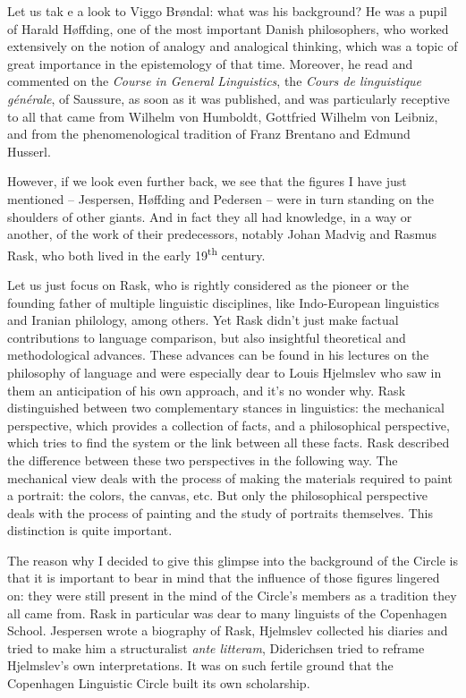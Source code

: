 Let us tak e a look to Viggo Brøndal: what was his background? He was a pupil of Harald Høffding, one of the most important Danish philosophers, who worked extensively on the notion of analogy and analogical thinking, which was a topic of great importance in the epistemology of that time. Moreover, he read and commented on the \textit{Course in General Linguistics}, the \textit{Cours de linguistique générale}, of Saussure, as soon as it was published, and was particularly receptive to all that came from Wilhelm von Humboldt, Gottfried Wilhelm von Leibniz, and from the phenomenological tradition of Franz Brentano and Edmund Husserl. 

However, if we look even further back, we see that the figures I have just mentioned – Jespersen, Høffding and Pedersen – were in turn standing on the shoulders of other giants. And in fact they all had knowledge, in a way or another, of the work of their predecessors, notably Johan Madvig and Rasmus Rask, who both lived in the early 19\textsuperscript{th} century. 

Let us just focus on Rask, who is rightly considered as the pioneer or the founding father of multiple linguistic disciplines, like Indo-European linguistics and Iranian philology, among others. Yet Rask didn’t just make factual contributions to language comparison, but also insightful theoretical and methodological advances. These advances can be found in his lectures on the philosophy of language and were especially dear to Louis Hjelmslev who saw in them an anticipation of his own approach, and it’s no wonder why. Rask distinguished between two complementary stances in linguistics: the mechanical perspective, which provides a collection of facts, and a philosophical perspective, which tries to find the system or the link between all these facts. Rask described the difference between these two perspectives in the following way. The mechanical view deals with the process of making the materials required to paint a portrait: the colors, the canvas, etc. But only the philosophical perspective deals with the process of painting and the study of portraits themselves. This distinction is quite important. 

The reason why I decided to give this glimpse into the background of the Circle is that it is important to bear in mind that the influence of those figures lingered on: they were still present in the mind of the Circle’s members as a tradition they all came from. Rask in particular was dear to many linguists of the Copenhagen School. Jespersen wrote a biography of Rask, Hjelmslev collected his diaries and tried to make him a structuralist \textit{ante litteram}, Diderichsen tried to reframe Hjelmslev’s own interpretations. It was on such fertile ground that the Copenhagen Linguistic Circle built its own scholarship. 


